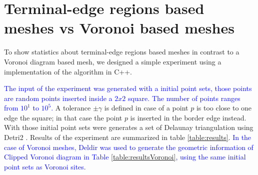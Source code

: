 








\section{Terminal-edge regions based meshes vs Voronoi based meshes}
\label{sec:experimental_evaluation}

To show statistics about terminal-edge regions based meshes in contrast to a Voronoi diagram based mesh, we designed a simple experiment using a implementation of the algorithm in C++. 

\textcolor{blue}{The input of the experiment was generated with a initial point sets, those points are random points inserted inside a $2x2$ square. The number of points ranges from $10^1$ to $10^5$.} A tolerance $\pm \gamma$ is defined in case of a point $p$ is too close to one edge the square; in that case the point $p$ is inserted in the border edge instead. With those initial point sets were generates a set of Delaunay triangulation using Detri2 \cite{Detri2}. Results of the experiment are summarized in table \ref{table:results}. \textcolor{blue}{In the case of Voronoi meshes, Deldir \cite{deldir} was used to generate the geometric information of Clipped Voronoi diagram in Table \ref{table:resultsVoronoi}, using the same initial point sets as Voronoi sites.}

